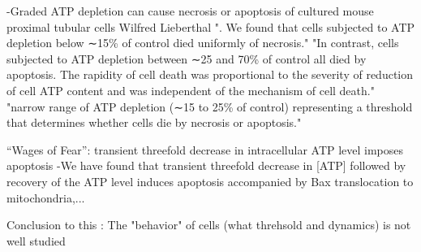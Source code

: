 \documentclass[11pt,a4paper]{article}
\begin{document}
-Graded ATP depletion can cause necrosis or apoptosis of cultured mouse proximal tubular cells
Wilfred Lieberthal
". We found that cells subjected to ATP depletion below ∼15\% of control died uniformly of necrosis."
"In contrast, cells subjected to ATP depletion between ∼25 and 70\% of control all died by apoptosis. The rapidity of cell death was proportional to the severity of reduction of cell ATP content and was independent of the mechanism of cell death."
"narrow range of ATP depletion (∼15 to 25\% of control) representing a threshold that determines whether cells die by necrosis or apoptosis."

“Wages of Fear”: transient threefold decrease in intracellular ATP level imposes apoptosis
-We have found that transient threefold decrease in [ATP] followed by recovery of the ATP level induces apoptosis accompanied by Bax translocation to mitochondria,...

Conclusion to this : The "behavior" of cells (what threhsold and dynamics) is not well studied 
\end{document}
